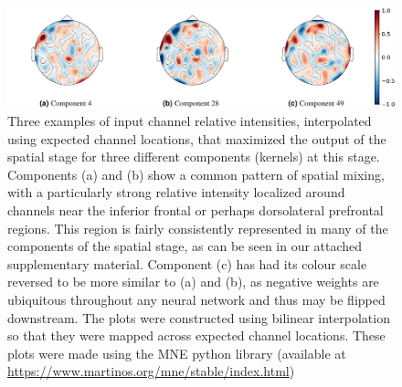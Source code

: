 \documentclass[fleqn,10pt]{wlscirep}
\begin{document}
\begin{figure}[h!]
  \centering\includegraphics[width=\linewidth]{components.pdf}
  \caption[textfind]{Three examples of input channel relative intensities, interpolated using expected channel locations, that maximized the output of the spatial stage for three different components (kernels) at this stage. Components (a) and (b) show a common pattern of spatial mixing, with a particularly strong relative intensity localized around channels near the inferior frontal or perhaps dorsolateral prefrontal regions. This region is fairly consistently represented in many of the components of the spatial stage, as can be seen in our attached supplementary material. Component (c) has had its colour scale reversed to be more similar to (a) and (b), as negative weights are ubiquitous throughout any neural network and thus may be flipped downstream. The plots were constructed using bilinear interpolation so that they were mapped across expected channel locations. These plots were made using the MNE python library (available at \url{https://www.martinos.org/mne/stable/index.html})}
  \label{fig:max_components}
\end{figure}

\end{document}
